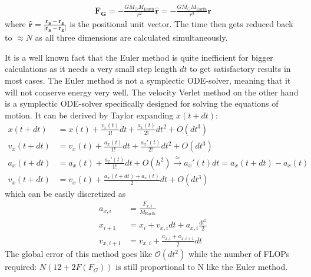 \documentclass[american,a4paper,12pt]{article}
\renewcommand{\vec}[1]{\mathbf{#1}} %
\newcommand{\ME}{\ensuremath{M_{\text{Earth}}}} %
\newcommand{\MS}{\ensuremath{M_{\odot}}} %
\begin{document}
\begin{align*}
    \vec{F_G} = -\frac{G \MS \ME}{r^2} \hat{\vec{r}} = -\frac{G \MS \ME}{r^3}\vec{r}
\end{align*}
where $\hat{\vec{r}} = \frac{\vec{r_S-r_E}}{|\vec{r_S-r_E}|}$ is the positional unit vector. The time then gets reduced back to $\approx N$ as all three dimensions are calculated simultaneously.

\newpage
It is a well known fact that the Euler method is quite inefficient for bigger calculations as it needs a very small step length $dt$ to get satisfactory results in most cases. The Euler method is not a symplectic ODE-solver, meaning that it will not conserve energy very well. The velocity Verlet method on the other hand is a symplectic ODE-solver specifically designed for solving the equations of motion\cite{verlet}. It can be derived by Taylor expanding $x(t + dt)$:
\begin{align*}
    x(t+dt) &= x(t) + \frac{v_x(t)}{1!}dt + \frac{a_x(t)}{2!}dt^2 + O(dt^3)\\
    v_x(t+dt) &= v_x(t) + \frac{a_x(t)}{1!}dt  +  \frac{a_x'(t)}{2!}dt^2 + O(dt^3)\\
    a_x(t+dt) &= a_x(t) + \frac{a_x'(t)}{1!}dt + O(h^2) \overset{\approx}{\to} a_x'(t)dt = a_x(t+dt) - a_x(t)\\
    v_x(t+dt) &= v_x(t) + \frac{a_x(t+dt) + a_x(t)}{2}dt + O(dt^3)
\end{align*}
which can be easily discretized as
\begin{align*}
     a_{x,i} &= \frac{F_{x,i}}{\ME} \\
    x_{i+1} &= x_i + v_{x,i} dt + a_{x,i} \frac{dt^2}{2}\\
    v_{x,i+1} &= v_{x,i} + \frac{a_{x,i} + a_{x,i+1}}{2}dt
\end{align*}
The global error of this method goes like $\mathcal{O}(dt^2)$ while the number of FLOPs required: $N(12 + 2 F(F_G))$ is still proportional to N like the Euler method. 
\end{document}
